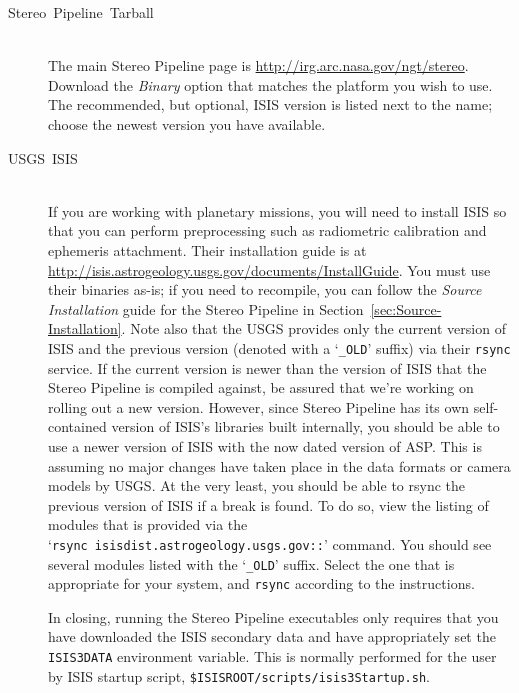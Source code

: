 \begin{description}
\item [{Stereo~Pipeline~Tarball}] \hspace*{\fill} \\
The main Stereo Pipeline page is
\url{http://irg.arc.nasa.gov/ngt/stereo}.  Download the \emph{Binary}
option that matches the platform you wish to use. The recommended, but
optional, \ac{ISIS} version is listed next to the name; choose the
newest version you have available.

\item [{USGS~ISIS}] \hspace*{\fill} \\
If you are working with planetary missions, you will need to install
\ac{ISIS} so that you can perform preprocessing such as radiometric
calibration and ephemeris attachment. Their installation guide is at
\url{http://isis.astrogeology.usgs.gov/documents/InstallGuide}.  You
must use their binaries as-is; if you need to recompile, you can
follow the \emph{Source Installation} guide for the Stereo Pipeline in
Section~\ref{sec:Source-Installation}.  Note also that the \ac{USGS}
provides only the current version of \ac{ISIS} and the previous
version (denoted with a `\texttt{\_OLD}' suffix) via their
\texttt{rsync} service. If the current version is newer than the
version of ISIS that the Stereo Pipeline is compiled against, be
assured that we're working on rolling out a new version. However,
since Stereo Pipeline has its own self-contained version of ISIS's
libraries built internally, you should be able to use a newer version
of ISIS with the now dated version of \ac{ASP}. This is assuming no major
changes have taken place in the data formats or camera models by
\ac{USGS}. At the very least, you should be able to rsync the previous
version of ISIS if a break is found.  To do so, view the listing of
modules that is provided via the
`\texttt{rsync~isisdist.astrogeology.usgs.gov::}' command.  You should
see several modules listed with the `\texttt{\_OLD}' suffix.  Select
the one that is appropriate for your system, and \texttt{rsync}
according to the instructions.

In closing, running the Stereo Pipeline executables only requires that
you have downloaded the ISIS secondary data and have appropriately set
the \texttt{ISIS3DATA} environment variable. This is normally
performed for the user by ISIS startup script,
\texttt{\$ISISROOT/scripts/isis3Startup.sh}.

\end{description}

